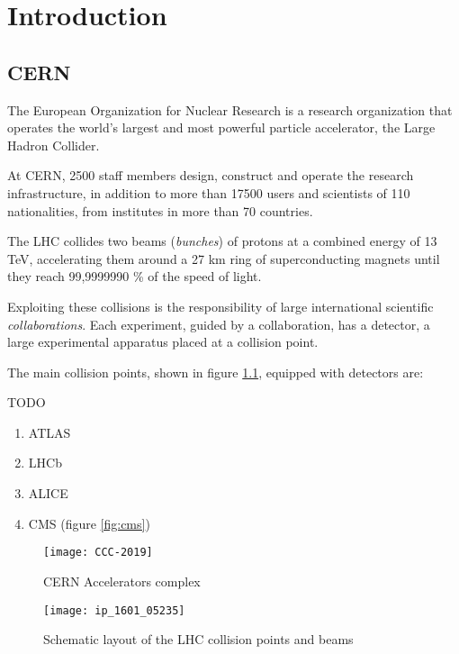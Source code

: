\chapter{Introduction}

\section{CERN}

The European Organization for Nuclear Research is a research organization that operates the world’s largest and most powerful particle accelerator, the Large Hadron Collider.

At CERN, 2500 staff members design, construct and operate the research infrastructure, in addition to more than 17500 users and scientists of 110 nationalities, from institutes in more than 70 countries.

The LHC collides two beams (\textit{bunches}) of protons at a combined energy of 13 TeV, accelerating them around a 27 km ring of superconducting magnets until they reach 99,9999990 \% of the speed of light.


Exploiting these collisions is the responsibility of large international scientific \textit{collaborations}. Each experiment, guided by a collaboration, has a detector, a large experimental apparatus placed at a collision point.

The main collision points, shown in figure \ref{fig:cern_complex}, equipped with detectors are:

TODO

\begin{enumerate}
	\item ATLAS
	\item LHCb
	\item ALICE
	\item CMS (figure \ref{fig:cms})
\end{enumerate}

\begin{figure}
	\centerline{
		\texttt{[image: CCC-2019]}}
	\caption{CERN Accelerators complex \cite{Mobs:2684277}}
	\label{fig:cern_complex}
\end{figure}

\begin{figure}
	\centerline{
		\texttt{[image: ip\_1601\_05235]}}
	\caption{Schematic layout of the LHC collision points and beams \cite{Herr:1982430}}
	\label{fig:ip}
\end{figure}



